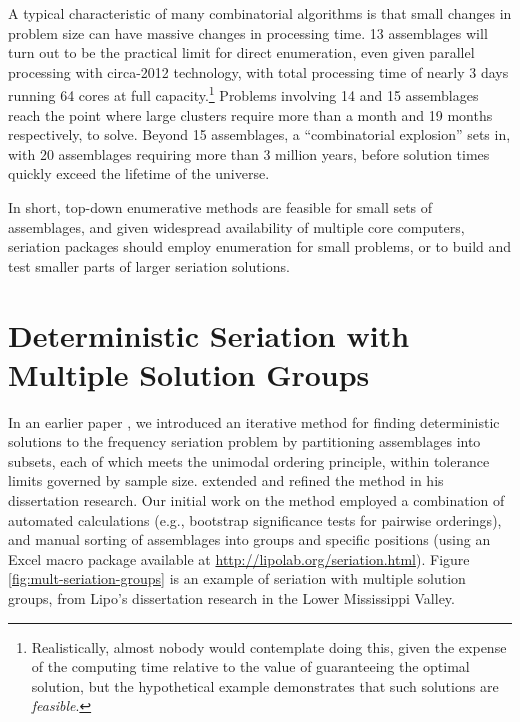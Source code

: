 
A typical characteristic of many combinatorial algorithms is that small changes in problem size can have massive changes in processing time.  13 assemblages will turn out to be the practical limit for direct enumeration, even given parallel processing with circa-2012 technology, with total processing time of nearly 3 days running 64 cores at full capacity.\footnote{Realistically, almost nobody would contemplate doing this, given the expense of the computing time relative to the value of guaranteeing the optimal solution, but the hypothetical example demonstrates that such solutions are \emph{feasible}.}  Problems involving 14 and 15 assemblages reach the point where large clusters require more than a month and 19 months respectively, to solve.  Beyond 15 assemblages, a ``combinatorial explosion'' sets in, with 20 assemblages requiring more than 3 million years, before solution times quickly exceed the lifetime of the universe.  

In short, top-down enumerative methods are feasible for small sets of assemblages, and given widespread availability of multiple core computers, seriation packages should employ enumeration for small problems, or to build and test smaller parts of larger seriation solutions.  

\section{Deterministic Seriation with Multiple Solution Groups}
\label{sec:seriation-groups}



In an earlier paper \citep{Lipo1997}, we introduced an iterative method for finding deterministic solutions to the frequency seriation problem by partitioning assemblages into subsets, each of which meets the unimodal ordering principle, within tolerance limits governed by sample size.  \citet{Lipo2001b} extended and refined the method in his dissertation research.  Our initial work on the method employed a combination of automated calculations (e.g., bootstrap significance tests for pairwise orderings), and manual sorting of assemblages into groups and specific positions (using an Excel macro package available at \url{http://lipolab.org/seriation.html}).  Figure \ref{fig:mult-seriation-groups} is an example of seriation with multiple solution groups, from Lipo's dissertation research in the Lower Mississippi Valley.  


